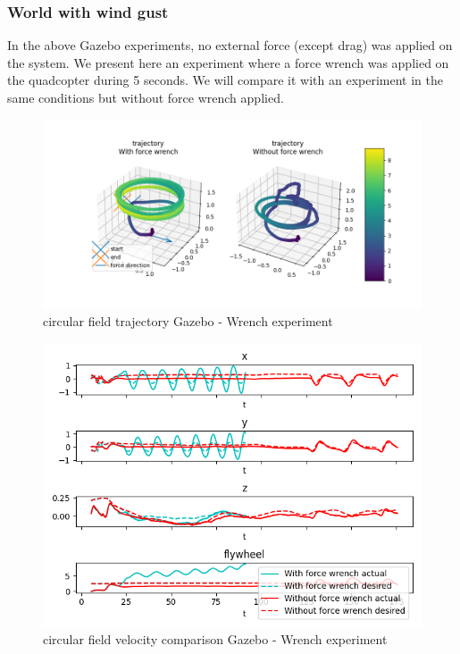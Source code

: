 \subsubsection{World with wind gust}
In the above Gazebo experiments, no external force (except drag) was applied on the system. 
We present here an experiment where a force wrench was applied on the quadcopter during 5 seconds. 
We will compare it with an experiment in the same conditions but without force wrench applied.
\begin{figure}[h!]
   \centering
   \includegraphics[width=\linewidth]{Images/gazebo_trajectory_wrench_circular.png}
   \caption{circular field trajectory Gazebo - Wrench experiment}
   \label{fig:trajgazebocircularfwrench}
\end{figure}
\begin{figure}[h!]
   \centering
   \includegraphics[width=\linewidth]{Images/gazebo_circular_wrench_V.png}
   \caption{circular field velocity comparison Gazebo - Wrench experiment}
   \label{fig:velgazebocircularfwrench}
\end{figure}
